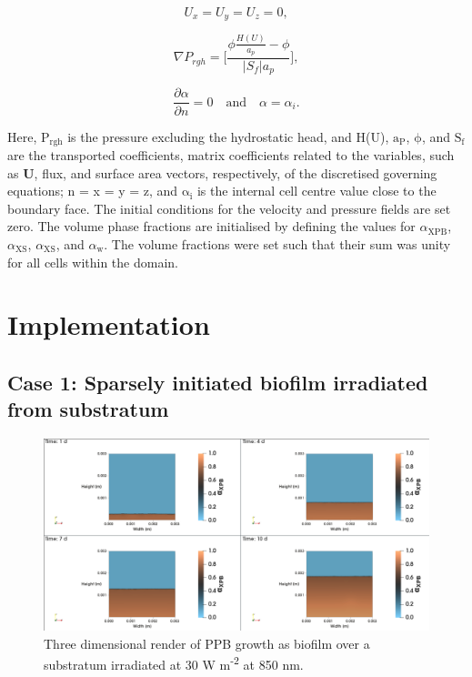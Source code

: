 \begin{equation}
    \label{eq:boundaryU}
    U_x = U_y = U_z = 0,
\end{equation}

\begin{equation}
    \label{eq:boundaryPrgh}
    \nabla P_{rgh} = \bigg[\frac{\phi \frac{H(U)}{a_p} - \phi}{|S_f|a_p} \bigg],
\end{equation}

\begin{equation}
    \label{eq:boundaryAlpha}
    \frac{\partial \alpha}{\partial n} = 0 \quad \mathrm{and} \quad \alpha = \alpha_i.
\end{equation}

Here, $\mathrm{P_{rgh}}$ is the pressure excluding the hydrostatic head, and H(U), $\mathrm{a_P}$, $\mathrm{\phi}$, and $\mathrm{S_f}$ are the transported coefficients, matrix coefficients related to the variables, such as \textbf{U}, flux, and surface area vectors, respectively, of the discretised governing equations; n = x = y = z, and $\mathrm{\alpha_i}$ is the internal cell centre value close to the boundary face. The initial conditions for the velocity and pressure fields are set zero. The volume phase fractions are initialised by defining the values for $\alpha_{\mathrm{XPB}}$, $\alpha_{\mathrm{XS}}$, $\alpha_{\mathrm{XS}}$, and $\alpha_{\mathrm{w}}$. The volume fractions were set such that their sum was unity for all cells within the domain. 


\section{Implementation}

\subsection{Case 1: Sparsely initiated biofilm irradiated from substratum}
\begin{figure}[H]
    \centering
    \includegraphics[width=\textwidth,height=0.4\textheight]{Chap4/results/post_processing/2D_cases/case1_ppb.png}
    \caption{Three dimensional render of PPB growth as biofilm over a substratum irradiated at 30 W m\textsuperscript{-2} at 850 nm. } 
    \label{fig:case5_alpha_distro}
\end{figure}



